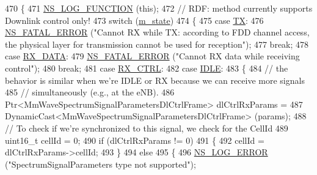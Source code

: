 \begin{DoxyCode}
470 \{
471         \hyperlink{log-macros-disabled_8h_a90b90d5bad1f39cb1b64923ea94c0761}{NS\_LOG\_FUNCTION} (\textcolor{keyword}{this});
472         \textcolor{comment}{// RDF: method currently supports Downlink control only!}
473         \textcolor{keywordflow}{switch} (\hyperlink{classns3_1_1MmWaveSpectrumPhy_ab6330aa9de7700e7e15b82000335665d}{m\_state})
474         \{
475                 \textcolor{keywordflow}{case} \hyperlink{classns3_1_1MmWaveSpectrumPhy_a665335f60416cf031a9b68209e4368aea1009d660cb8095bc16053fc9909ae695}{TX}:
476                         \hyperlink{group__fatal_ga5131d5e3f75d7d4cbfd706ac456fdc85}{NS\_FATAL\_ERROR} (\textcolor{stringliteral}{"Cannot RX while TX: according to FDD channel access,
       the physical layer for transmission cannot be used for reception"});
477                         \textcolor{keywordflow}{break};
478                 \textcolor{keywordflow}{case} \hyperlink{classns3_1_1MmWaveSpectrumPhy_a665335f60416cf031a9b68209e4368aea5283250c41727eee6b26940406b690d9}{RX\_DATA}:
479                         \hyperlink{group__fatal_ga5131d5e3f75d7d4cbfd706ac456fdc85}{NS\_FATAL\_ERROR} (\textcolor{stringliteral}{"Cannot RX data while receiving control"});
480                         \textcolor{keywordflow}{break};
481                 \textcolor{keywordflow}{case} \hyperlink{classns3_1_1MmWaveSpectrumPhy_a665335f60416cf031a9b68209e4368aea1f35c17b447eeb9d376715d1910540fc}{RX\_CTRL}:
482                 \textcolor{keywordflow}{case} \hyperlink{classns3_1_1MmWaveSpectrumPhy_a665335f60416cf031a9b68209e4368aeadae9004ebbfa9610354cf62b76eed607}{IDLE}:
483                 \{
484                         \textcolor{comment}{// the behavior is similar when we're IDLE or RX because we can receive more
       signals}
485                         \textcolor{comment}{// simultaneously (e.g., at the eNB).}
486                         Ptr<MmWaveSpectrumSignalParametersDlCtrlFrame> dlCtrlRxParams =
487                                         DynamicCast<MmWaveSpectrumSignalParametersDlCtrlFrame> (params);
488                         \textcolor{comment}{// To check if we're synchronized to this signal, we check for the CellId}
489                         uint16\_t cellId = 0;
490                         \textcolor{keywordflow}{if} (dlCtrlRxParams != 0)
491                         \{
492                                 cellId = dlCtrlRxParams->cellId;
493                         \}
494                         \textcolor{keywordflow}{else}
495                         \{
496                                 \hyperlink{group__logging_ga0261a8db1d4ac5f79417d117634fd455}{NS\_LOG\_ERROR} (\textcolor{stringliteral}{"SpectrumSignalParameters type not supported"});

\end{DoxyCode}
